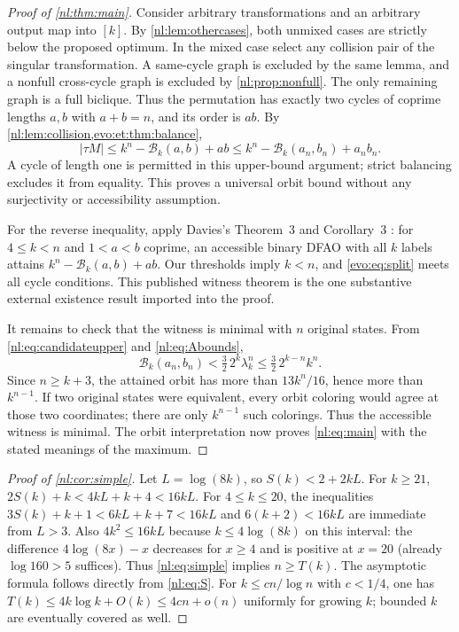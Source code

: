 \documentclass[11pt,a4paper]{article}
\numberwithin{equation}{section}
\theoremstyle{definition}
\theoremstyle{remark}
\newcommand{\Bip}{\mathcal B}
\begin{document}
\begin{proof}[Proof of \cref{nl:thm:main}]
Consider arbitrary transformations and an arbitrary output map into $[k]$.
By \cref{nl:lem:othercases}, both unmixed cases are strictly below the proposed
optimum. In the mixed case select any collision pair of the singular
transformation. A same-cycle graph is excluded by the same lemma, and a
nonfull cross-cycle graph is excluded by \cref{nl:prop:nonfull}.
The only remaining graph is a full biclique. Thus the permutation has
exactly two cycles of coprime lengths $a,b$ with $a+b=n$, and its order is
$ab$. By \cref{nl:lem:collision,evo:et:thm:balance},
\[
 |\tau M|\le k^n-\Bip_k(a,b)+ab
 \le k^n-\Bip_k(a_n,b_n)+a_nb_n.
\]
A cycle of length one is permitted in this upper-bound argument; strict
balancing excludes it from equality. This proves a universal orbit bound
without any surjectivity or accessibility assumption.

For the reverse inequality, apply Davies's Theorem~3 and Corollary~3
\cite{Davies2017}: for $4\le k<n$ and $1<a<b$ coprime, an accessible binary
DFAO with all $k$ labels attains $k^n-\Bip_k(a,b)+ab$.
Our thresholds imply $k<n$, and \eqref{evo:eq:split} meets all cycle conditions.
This published witness theorem is the one substantive external existence
result imported into the proof.

It remains to check that the witness is minimal with $n$ original states.
From \eqref{nl:eq:candidateupper} and \eqref{nl:eq:Abounds},
\[
 \Bip_k(a_n,b_n)<\tfrac32\,2^k\lambda_k^n
 \le\tfrac32\,2^{k-n}k^n.
\]
Since $n\ge k+3$, the attained orbit has more than $13k^n/16$, hence more
than $k^{n-1}$. If two original states were equivalent, every orbit
coloring would agree at those two coordinates; there are only $k^{n-1}$
such colorings. Thus the accessible witness is minimal. The orbit
interpretation now proves \eqref{nl:eq:main} with the stated meanings of the
maximum.
\end{proof}

\begin{proof}[Proof of \cref{nl:cor:simple}]
Let $L=\log(8k)$, so $S(k)<2+2kL$.
For $k\ge21$, $2S(k)+k<4kL+k+4<16kL$.
For $4\le k\le20$, the inequalities
$3S(k)+k+1<6kL+k+7<16kL$ and $6(k+2)<16kL$ are immediate from $L>3$.
Also $4k^2\le16kL$ because $k\le4\log(8k)$ on this interval:
the difference $4\log(8x)-x$ decreases for $x\ge4$ and is positive at
$x=20$ (already $\log160>5$ suffices). Thus \eqref{nl:eq:simple} implies
$n\ge T(k)$. The asymptotic formula follows directly from \eqref{nl:eq:S}.
For $k\le c n/\log n$ with $c<1/4$, one has
$T(k)\le4k\log k+O(k)\le4cn+o(n)$ uniformly for growing $k$;
bounded $k$ are eventually covered as well.
\end{proof}
\end{document}
